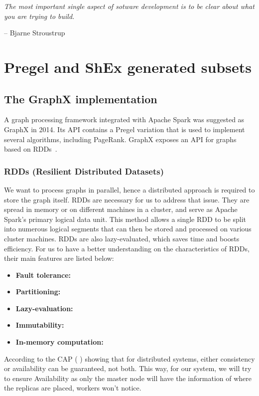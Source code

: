 \epigraph{\textit{The most important single aspect of sotware development is to be clear about what you are trying to build.}}{-- \textup{Bjarne Stroustrup}}

\section{Pregel and ShEx generated subsets}

\subsection{The GraphX implementation}

A graph processing framework integrated with Apache Spark was suggested as GraphX in 2014. Its API contains a Pregel variation that is used to implement several algorithms, including PageRank. GraphX exposes an API for graphs based on RDDs~\cite{https://doi.org/10.48550/arxiv.2110.11709}.

\subsubsection{RDDs (Resilient Distributed Datasets)}

We want to process graphs in parallel, hence a distributed approach is required to store the graph itself. RDDs are necessary for us to address that issue. They are spread in memory or on different machines in a cluster, and serve as Apache Spark's primary logical data unit. This method allows a single RDD to be split into numerous logical segments that can then be stored and processed on various cluster machines. RDDs are also lazy-evaluated, which saves time and boosts efficiency. For us to have a better understanding on the characteristics of RDDs, their main features are listed below:

\begin{itemize}
    \item \textbf{Fault tolerance:}
    \item \textbf{Partitioning:}
    \item \textbf{Lazy-evaluation:}
    \item \textbf{Immutability:}
    \item \textbf{In-memory computation:}
\end{itemize}

According to the CAP (  ) showing that for distributed systems, either consistency or availability can be guaranteed, not both. This way, for our system, we will try to ensure Availability as only the master node will have the information of where the replicas are placed, workers won't notice.

